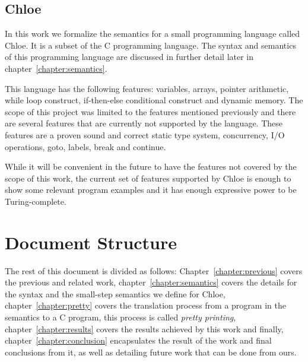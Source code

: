 \subsection{Chloe}\label{subsection:chloe}

In this work we formalize the semantics for a small programming language called Chloe.
It is a subset of the C programming language.
The syntax and semantics of this programming language are discussed in further detail later in chapter~\ref{chapter:semantics}.

This language has the following features: variables, arrays, pointer arithmetic, while loop construct, if-then-else conditional construct and dynamic memory.
The scope of this project was limited to the features mentioned previously and there are several features that are currently not supported by the language.
These features are a proven sound and correct static type system, concurrency, I/O operations, goto, labels, break and continue.

While it will be convenient in the future to have the features not covered by the scope of this work, the current set of features supported by Chloe is enough to show some relevant program examples and it has enough expressive power to be Turing-complete.


\section{Document Structure}\label{section:document_structure}

The rest of this document is divided as follows: Chapter~\ref{chapter:previous} covers the previous and related work, chapter~\ref{chapter:semantics} covers the details for the syntax and the small-step semantics we define for Chloe, chapter~\ref{chapter:pretty} covers the translation process from a program in the semantics to a C program, this process is called \textit{pretty printing}, chapter~\ref{chapter:results} covers the results achieved by this work and finally, chapter~\ref{chapter:conclusion} encapsulates the result of the work and final conclusions from it, as well as detailing future work that can be done from ours.
